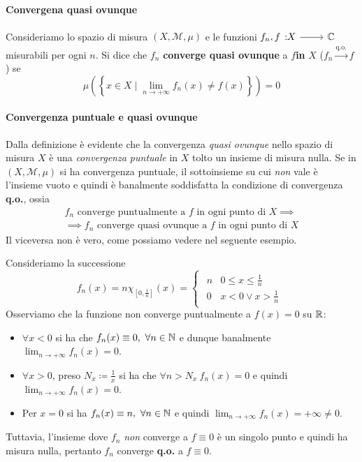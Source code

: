 \paragraph{Convergena quasi ovunque}
\begin{define}
	Consideriamo lo spazio di misura $\left(X,\mathcal{M},\mu\right)$ e le funzioni $\funz{f_n,f}{X}{\complexset}$ misurabili per ogni $n$. Si dice che
	$f_n$ \textbf{converge quasi ovunque} a $f$\textbf{in} $X$ ($f_n\overset{\text{q.o.}}{\to} f$) se
	\begin{equation}
		\mu\left(\left\{x\in X\mid \lim_{n\to+\infty}f_n(x)\neq f(x)\right\}\right)=0
	\end{equation}
\end{define}
\paragraph{Convergenza puntuale e quasi ovunque}
Dalla definizione è evidente che la convergenza \textit{quasi ovunque} nello spazio di misura $X$ è una \textit{convergenza puntuale} in $X$ tolto un insieme di misura nulla. Se in $\left(X,\mathcal{M},\mu\right)$ si ha convergenza puntuale, il sottoinsieme su cui \textit{non} vale è l'insieme vuoto e quindi è banalmente soddisfatta la condizione di convergenza \textbf{q.o.}, ossia
\begin{multline}
	f_n\text{ converge puntualmente a }f\text{ in ogni punto di }X\implies\\
	\implies f_n\text{ converge quasi ovunque a }f\text{ in ogni punto di }X
\end{multline}
Il viceversa non è vero, come possiamo vedere nel seguente esempio.
\begin{example}
	Consideriamo la successione
	\begin{equation*}
		f_n(x)=n\chi_{\left[0,\frac{1}{n}\right]}(x)=
		\begin{cases}
			\begin{array}{ll}
				n&0\leq x\leq\frac{1}{n}\\
				0&x< 0\vee x>\frac{1}{n}
			\end{array}
		\end{cases}
	\end{equation*}
	Osserviamo che la funzione non converge puntualmente a $f(x)=0$ su $\mathbb{R}$:
	\begin{itemize}
		\item $\forall x< 0$ si ha che $f_n(x)\equiv 0,\ \forall n\in\mathbb{N}$ e dunque banalmente $\displaystyle\lim_{n\to+\infty}f_n(x)=0$.
		\item $\forall x>0$, preso $N_x\coloneqq\frac{1}{x}$ si ha che $\forall n>N_x\ f_n(x)=0$ e quindi $\displaystyle\lim_{n\to+\infty}f_n(x)=0$.
		\item Per $x=0$ si ha $f_n(x)\equiv n,\ \forall n\in\mathbb{N}$ e quindi $\displaystyle\lim_{n\to+\infty}f_n(x)=+\infty\neq0$.
	\end{itemize}
Tuttavia, l'insieme dove $f_n$ \textit{non} converge a $f\equiv0$ è un singolo punto e quindi ha misura nulla, pertanto $f_n$ converge \textbf{q.o.} a $f\equiv 0$.
\end{example}
